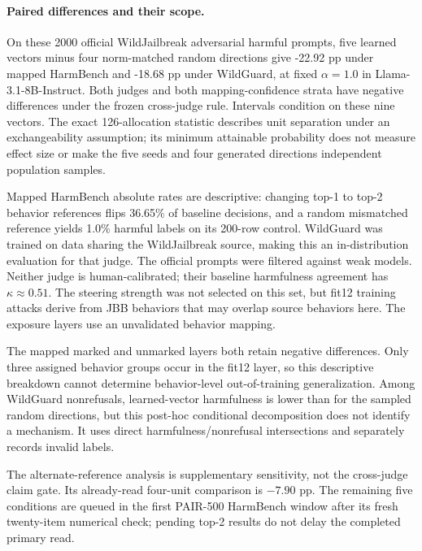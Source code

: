 \paragraph{Paired differences and their scope.}
On these 2000 official WildJailbreak adversarial harmful prompts, five learned vectors minus four norm-matched random directions give -22.92 pp under mapped HarmBench and -18.68 pp under WildGuard, at fixed $\alpha=1.0$ in Llama-3.1-8B-Instruct. Both judges and both mapping-confidence strata have negative differences under the frozen cross-judge rule. Intervals condition on these nine vectors. The exact 126-allocation statistic describes unit separation under an exchangeability assumption; its minimum attainable probability does not measure effect size or make the five seeds and four generated directions independent population samples.

Mapped HarmBench absolute rates are descriptive: changing top-1 to top-2 behavior references flips 36.65\% of baseline decisions, and a random mismatched reference yields 1.0\% harmful labels on its 200-row control. WildGuard was trained on data sharing the WildJailbreak source, making this an in-distribution evaluation for that judge. The official prompts were filtered against weak models. Neither judge is human-calibrated; their baseline harmfulness agreement has $\kappa\approx0.51$. The steering strength was not selected on this set, but fit12 training attacks derive from JBB behaviors that may overlap source behaviors here. The exposure layers use an unvalidated behavior mapping.



The mapped marked and unmarked layers both retain negative differences. Only three assigned behavior groups occur in the fit12 layer, so this descriptive breakdown cannot determine behavior-level out-of-training generalization. Among WildGuard nonrefusals, learned-vector harmfulness is lower than for the sampled random directions, but this post-hoc conditional decomposition does not identify a mechanism. It uses direct harmfulness/nonrefusal intersections and separately records invalid labels.

The alternate-reference analysis is supplementary sensitivity, not the cross-judge claim gate. Its already-read four-unit comparison is $-7.90$ pp. The remaining five conditions are queued in the first PAIR-500 HarmBench window after its fresh twenty-item numerical check; pending top-2 results do not delay the completed primary read.
